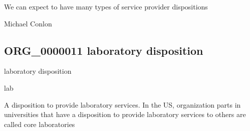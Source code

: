 \documentclass[letterpaper,10pt,english]{sphinxmanual}
\begin{document}
\begin{sphinxShadowBox}

\sphinxAtStartPar
We can expect to have many types of service provider dispositions
\end{sphinxShadowBox}

\begin{sphinxShadowBox}

\sphinxAtStartPar
Michael Conlon 
\end{sphinxShadowBox}
\begin{quote}

\ignorespaces \end{quote}


\subsection{ORG\_0000011 \sphinxhyphen{} laboratory disposition}
\label{\detokenize{doc-ORG_0000011:org-0000011-laboratory-disposition}}\label{\detokenize{doc-ORG_0000011:index-0}}\label{\detokenize{doc-ORG_0000011::doc}}
\begin{sphinxShadowBox}

\sphinxAtStartPar
laboratory disposition
\end{sphinxShadowBox}

\begin{sphinxShadowBox}

\sphinxAtStartPar
lab
\end{sphinxShadowBox}

\begin{sphinxShadowBox}

\sphinxAtStartPar
{\hyperref[\detokenize{doc-BFO_0000016::doc}]{}}
\end{sphinxShadowBox}

\begin{sphinxShadowBox}

\sphinxAtStartPar
A disposition to provide laboratory services.  In the US, organization parts in universities that have a disposition to provide laboratory services to others are called core laboratories
\end{sphinxShadowBox}
\end{document}

